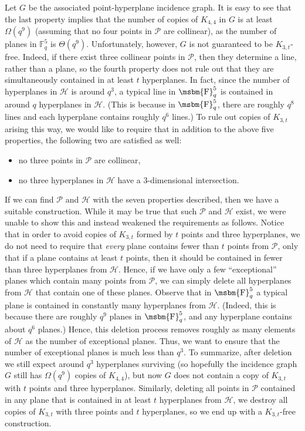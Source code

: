 \documentclass[12pt]{article}
\newcommand{\FF}{\mbox{\msbm{F}}}
\begin{document}
Let $G$ be the associated point-hyperplane incidence graph. It is easy to see that the last property implies that the number of copies of $K_{4,4}$  in $G$ is at least $\Omega(q^{9})$ (assuming that no four points in $\mathcal{P}$ are collinear), as the number of planes in $\mathbb{F}_q^5$ is $\Theta(q^9)$. Unfortunately, however, $G$ is not guaranteed to be $K_{3,t}$-free. Indeed, if there exist three collinear points in $\mathcal{P}$, then they determine a line, rather than a plane, so the fourth property does not rule out that they are simultaneously contained in at least $t$ hyperplanes. In fact, since the number of hyperplanes in $\mathcal{H}$ is around $q^3$, a typical line in $\FF_q^5$ is contained in around $q$ hyperplanes in $\mathcal{H}$. (This is because in $\FF_q^5$, there are roughly $q^8$ lines and each hyperplane contains roughly $q^6$ lines.) To rule out copies of $K_{3,t}$ arising this way, we would like to require that in addition to the above five properties, the following two are satisfied as well:
\begin{itemize}
    \item no three points in $\mathcal{P}$ are collinear, \item no three hyperplanes in $\mathcal{H}$ have a $3$-dimensional intersection.
\end{itemize}

If we can find $\mathcal{P}$ and $\mathcal{H}$ with the seven properties described, then we have a suitable construction. While it may be true that such $\mathcal{P}$ and $\mathcal{H}$ exist, we were unable to show this and instead weakened the requirements as follows. Notice that in order to avoid copies of $K_{3,t}$ formed by $t$ points and three hyperplanes, we do not need to require that \emph{every} plane contains fewer than $t$ points from $\mathcal{P}$, only that if a plane contains at least $t$ points, then it should be contained in fewer than three hyperplanes from $\mathcal{H}$. Hence, if we have only a few ``exceptional'' planes which contain many points from $\mathcal{P}$, we can simply delete all hyperplanes from $\mathcal{H}$ that contain one of these planes. Observe that in $\FF_q^5$ a typical plane is contained in constantly many hyperplanes from $\mathcal{H}$. (Indeed, this is because there are roughly $q^9$ planes in $\FF_q^5$, and any hyperplane contains about $q^6$ planes.)  Hence, this deletion process removes roughly as many elements of $\mathcal{H}$ as the number of exceptional planes. Thus, we want to ensure that the number of exceptional planes is much less than $q^3$. To summarize, after deletion we still expect around $q^3$ hyperplanes surviving (so hopefully the incidence graph $G$ still has $\Omega(q^9)$ copies of $K_{4,4}$), but now $G$ does not contain a copy of $K_{3,t}$ with $t$ points and three hyperplanes. Similarly, deleting all points in $\mathcal{P}$ contained in any plane that is contained in at least $t$ hyperplanes from $\mathcal{H}$, we destroy all copies of $K_{3,t}$ with three points and $t$ hyperplanes, so we end up with a $K_{3,t}$-free construction.
\end{document}
